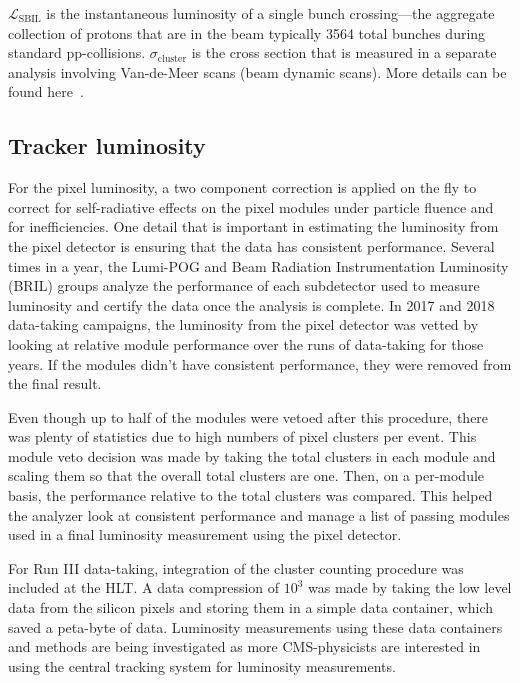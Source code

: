 $\mathcal{L}_{\text{SBIL}}$ is the instantaneous luminosity of a single bunch crossing---the aggregate collection of protons that are in the beam typically 3564 total bunches during standard pp-collisions. $\sigma_{\text{cluster}}$ is the cross section that is measured in a separate analysis involving Van-de-Meer scans (beam dynamic scans). More details can be found here~\cite{Knolle:2792593}. 


\subsection{Tracker luminosity}
For the pixel luminosity, a two component correction is applied on the fly to correct for self-radiative effects on the pixel modules under particle fluence and for inefficiencies.  
One detail that is important in estimating the luminosity from the pixel detector is ensuring that the data has consistent performance. Several times in a year, the Lumi-POG and Beam Radiation Instrumentation Luminosity (BRIL) groups analyze the performance of each subdetector used to measure luminosity and certify the data once the analysis is complete. In 2017 and 2018 data-taking campaigns, the luminosity from the pixel detector was vetted by looking at relative module performance over the runs of data-taking for those years. If the modules didn't have consistent performance, they were removed from the final result. 

Even though up to half of the modules were vetoed after this procedure, there was plenty of statistics due to high numbers of pixel clusters per event. 
This module veto decision was made by taking the total clusters in each module and scaling them so that the overall total clusters are one. Then, on a per-module basis, the performance relative to the total clusters was compared. This helped the analyzer look at consistent performance and manage a list of passing modules used in a final luminosity measurement using the pixel detector. 

For Run III data-taking, integration of the cluster counting procedure was included at the HLT. A data compression of $10^3$ was made by taking the low level data from the silicon pixels and storing them in a simple data container, which saved a peta-byte of data. Luminosity measurements using these data containers and methods are being investigated as more CMS-physicists are interested in using the central tracking system for luminosity measurements.




